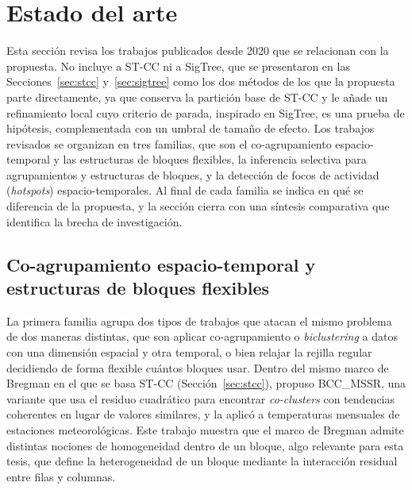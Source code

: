 
\section{Estado del arte}
\label{sec:estado-arte}

Esta sección revisa los trabajos publicados desde 2020 que se relacionan con la
propuesta. No incluye a \ac{ST-CC} ni a SigTree, que se presentaron en las
Secciones~\ref{sec:stcc} y~\ref{sec:sigtree} como los dos métodos de los que la
propuesta parte directamente, ya que conserva la partición base de \ac{ST-CC} y le
añade un refinamiento local cuyo criterio de parada, inspirado en SigTree, es una
prueba de hipótesis, complementada con un umbral de tamaño de efecto. Los trabajos
revisados se organizan en tres familias, que son el co-agrupamiento
espacio-temporal y las estructuras de bloques flexibles, la inferencia selectiva
para agrupamientos y estructuras de bloques, y la detección de focos de actividad
(\emph{hotspots}) espacio-temporales. Al final de cada familia se indica en qué se
diferencia de la propuesta, y la sección cierra con una síntesis comparativa que
identifica la brecha de investigación.

\subsection{Co-agrupamiento espacio-temporal y estructuras de bloques flexibles}
\label{sec:ea_coagrupamiento}

La primera familia agrupa dos tipos de trabajos que atacan el mismo
problema de dos maneras distintas, que son aplicar co-agrupamiento o \emph{biclustering} a
datos con una dimensión espacial y otra temporal, o bien relajar la rejilla
regular decidiendo de forma flexible cuántos bloques usar. Dentro del mismo marco de Bregman en el que se basa \ac{ST-CC}
(Sección~\ref{sec:stcc}), \citet{Wu2022} propuso BCC\_MSSR, una
variante que usa el residuo cuadrático para encontrar \emph{co-clusters} con
tendencias coherentes en lugar de valores similares, y la aplicó a
temperaturas mensuales de estaciones meteorológicas. Este trabajo muestra
que el marco de Bregman admite distintas nociones de homogeneidad dentro de
un bloque, algo relevante para esta tesis, que define la heterogeneidad de
un bloque mediante la interacción residual entre filas y columnas.

